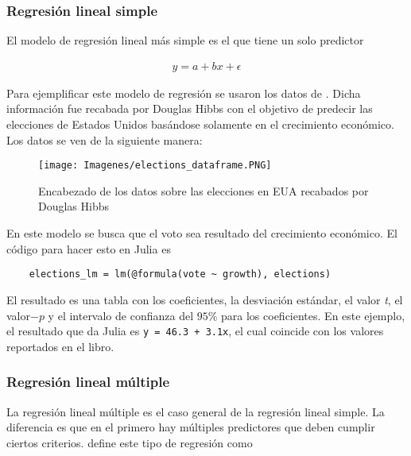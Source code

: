 \subsubsection{Regresión lineal simple}
El modelo de regresión lineal más simple es el que tiene un solo predictor

\begin{equation*}
    \begin{aligned}
    y = a + bx + \epsilon
    \end{aligned}
\end{equation*}

Para ejemplificar este modelo de regresión se usaron los datos de \cite{regression_other_stories}. Dicha información fue recabada por Douglas Hibbs con el objetivo de predecir las elecciones de Estados Unidos basándose solamente en el crecimiento económico. Los datos se ven de la siguiente manera: 

\begin{figure}[H]
\begin{center}
\texttt{[image: Imagenes/elections\_dataframe.PNG]}
\caption{Encabezado de los datos sobre las elecciones en EUA recabados por Douglas Hibbs}
  \label{elections_dataframe}
\end{center}
\end{figure}

En este modelo se busca que el voto sea resultado del crecimiento económico. El código para hacer esto en \textsf{Julia} es

\begin{verbatim}
	elections_lm = lm(@formula(vote ~ growth), elections)
\end{verbatim}

El resultado es una tabla con los coeficientes, la desviación estándar, el valor \textit{t}, el valor$-p$ y el intervalo de confianza del $95 \% $ para los coeficientes. En este ejemplo, el resultado que da \textsf{Julia} es \texttt{y = 46.3 + 3.1x}, el cual coincide con los valores reportados en el libro.

\subsubsection{Regresión lineal múltiple}
La regresión lineal múltiple es el caso general de la regresión lineal simple. La diferencia es que en el primero hay múltiples predictores que deben cumplir ciertos criterios. \cite{regression_other_stories} define este tipo de regresión como 

